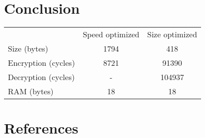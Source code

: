 \documentclass{llncs}
\begin{document}
\section{Conclusion}
	\begin{tabular}{ l c c }
                & Speed optimized & Size optimized \\
        Size (bytes) & 1794 & 418 \\
        Encryption (cycles) & 8721 & 91390 \\
        Decryption (cycles) & - & 104937 \\
        RAM (bytes) & 18 & 18

	\end{tabular}

\section{References}
{}

\end{document}
